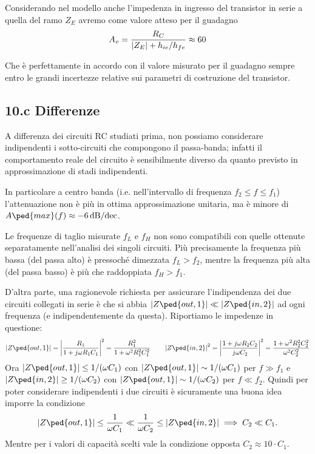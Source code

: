 \documentclass[10pt,a4paper]{article}
\begin{document}
Considerando nel modello anche l'impedenza in ingresso del transistor in
serie a quella del ramo $Z_E$ avremo come valore atteso per il guadagno
\begin{equation}
A_v = \frac{R_C}{\left| Z_E \right| + h_{ie}/h_{fe}} \approx 60
\end{equation}

Che è perfettamente in accordo con il valore misurato per il guadagno sempre
entro le grandi incertezze relative sui parametri di costruzione del
transistor.

\iffalse
\subsection*{10.c Differenze}
A differenza dei circuiti RC studiati prima, non possiamo considerare
indipendenti i sotto-circuiti che compongono il passa-banda; infatti il
comportamento reale del circuito è sensibilmente diverso da quanto previsto in 
approssimazione di stadi indipendenti.

In particolare a centro banda (i.e. nell'intervallo di frequenza
$f_2 \leq f \leq f_1$) l'attenuazione non è più in ottima approssimazione
unitaria, ma è minore di $A\ped{max}(f) \approx \SI{-6}{\dB/dec}$.

Le frequenze di taglio misurate $f_L$ e $f_H$ non sono compatibili con quelle
ottenute separatamente nell'analisi dei singoli circuiti. Più precisamente
la frequenza più bassa (del passa alto) è pressoché dimezzata
$f_L > f_2$, mentre la frequenza più alta (del passa basso) è più che
raddoppiata $f_H > f_1$.

D'altra parte, una ragionevole richiesta per assicurare l'indipendenza dei due
circuiti collegati in serie è che si abbia
$\abs{Z\ped{out, 1}} \ll \abs{Z\ped{in,2}}$ ad ogni frequenza (e 
indipendentemente da questa). Riportiamo le impedenze in questione:
\[
\abs{Z\ped{out, 1}} = \abs{\frac{R_1}{1 + j \omega R_1 C_1}}^2 = 
\frac{R_1^2}{1 + \omega^2 R_1^2 C_1^2}
\qquad
\abs{Z\ped{in, 2}}^2 = \abs{\frac{1 + j \omega R_2 C_2}{j\omega 
C_2}}^2 = \frac{1 + \omega^2 R_2^2 C_2^2}{\omega^2 C_2^2}
\]
Ora $\abs{Z\ped{out, 1}} \leq 1/(\omega C_1)$ con $\abs{Z\ped{out, 
1}} \sim 1/(\omega C_1)$ per $f \gg f_1 $ e $\abs{Z\ped{in, 2}} 
\geq 1/(\omega C_2)$ con $\abs{Z\ped{out, 1}} \sim 1/(\omega C_2) 
$ per $ f \ll f_2 $. Quindi per poter considerare indipendenti i due circuiti
è sicuramente una buona idea imporre la condizione
\[
\abs{Z\ped{out, 1}} \leq \frac{1}{\omega C_1} \ll \frac{1}{\omega C_2} \leq 
\abs{Z\ped{in, 2}} \implies C_2 \ll C_1.
\]
Mentre per i valori di capacità scelti vale la condizione opposta
$C_2 \approx 10 \cdot C_1$.
\end{document}
